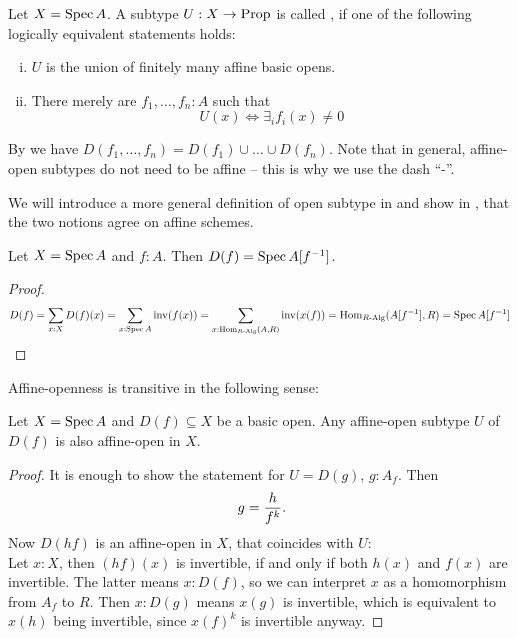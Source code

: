 \begin{definition}%
  \label{affine-open}
  Let $X=\operatorname{Spec} A$.
  A subtype $U:X\to\mathrm{Prop}$ is called ,
  if one of the following logically equivalent statements holds:
  \begin{enumerate}[(i)]%
  \item $U$ is the union of finitely many affine basic opens.
  \item There merely are $f_1,\dots,f_n:A$ such that
    \[U(x) \Leftrightarrow \exists_{i} f_i(x)\neq 0 \]
  \end{enumerate}
\end{definition}

By  we have $D(f_1, \dots, f_n) = D(f_1) \cup \dots \cup D(f_n)$.
Note that in general, affine-open subtypes do not need to be affine
-- this is why we use the dash ``-''.

We will introduce a more general definition of open subtype in 
and show in , that the two notions agree on affine schemes.

\begin{proposition}
  Let $X = \operatorname{Spec} A$ and $f : A$.
  Then $D(f) = \operatorname{Spec} A[f^{-1}]$.
\end{proposition}

\begin{proof}
  \[ D(f) =
     \sum_{x : X} D(f)(x) =
     \sum_{x : \operatorname{Spec} A} \mathrm{inv}(f(x)) =
     \sum_{x : \mathrm{Hom}_{R\text{-}\mathrm{Alg}}(A, R)} \mathrm{inv}(x(f)) =
     \mathrm{Hom}_{R\text{-}\mathrm{Alg}}(A[f^{-1}], R) =
     \operatorname{Spec} A[f^{-1}]
     \]
\end{proof}

Affine-openness is transitive in the following sense:

\begin{lemma}%
  \label{affine-open-trans}
  Let $X=\operatorname{Spec} A$ and $D(f)\subseteq X$ be a basic open.
  Any affine-open subtype $U$ of $D(f)$ is also affine-open in $X$.
\end{lemma}

\begin{proof}
  It is enough to show the statement for $U=D(g)$, $g:A_f$.
  Then
  \[ g=\frac{h}{f^k}\rlap{.}\]
  Now $D(hf)$ is an affine-open in $X$,
  that coincides with $U$: \\
  Let $x:X$, then $(hf)(x)$ is invertible, if and only if both $h(x)$ and $f(x)$ are invertible.
  The latter means $x:D(f)$, so we can interpret $x$ as a homomorphism from $A_f$ to $R$.
  Then $x:D(g)$ means $x(g)$ is invertible, which is equivalent to $x(h)$ being invertible,
  since $x(f)^k$ is invertible anyway.
\end{proof}

